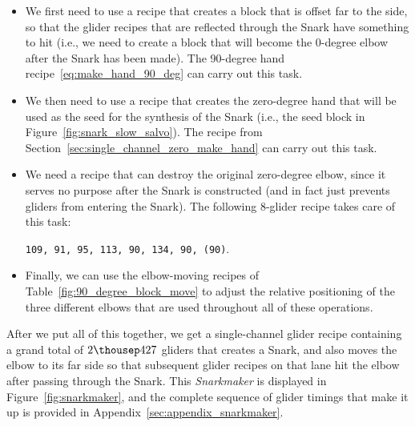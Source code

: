 \begin{itemize}
	\item We first need to use a recipe that creates a block that is offset far to the side, so that the glider recipes that are reflected through the Snark have something to hit (i.e., we need to create a block that will become the 0-degree elbow after the Snark has been made). The 90-degree hand recipe~\eqref{eq:make_hand_90_deg} can carry out this task.\smallskip
	
	\item We then need to use a recipe that creates the zero-degree hand that will be used as the seed for the synthesis of the Snark (i.e., the seed block in Figure~\ref{fig:snark_slow_salvo}). The recipe from Section~\ref{sec:single_channel_zero_make_hand} can carry out this task.\smallskip
	
	\item We need a recipe that can destroy the original zero-degree elbow, since it serves no purpose after the Snark is constructed (and in fact just prevents gliders from entering the Snark). The following 8-glider recipe takes care of this task:
	
	\begin{center}
		\texttt{\small 109, 91, 95, 113, 90, 134, 90, {\color{gray}(90)}}.
	\end{center}
	
	\item Finally, we can use the elbow-moving recipes of Table~\ref{fig:90_degree_block_move} to adjust the relative positioning of the three different elbows that are used throughout all of these operations.\smallskip
\end{itemize}

After we put all of this together, we get a single-channel glider recipe containing a grand total of $2{\thousep}427$ gliders that creates a Snark, and also moves the elbow to its far side so that subsequent glider recipes on that lane hit the elbow after passing through the Snark. This \emph{Snarkmaker} is displayed in Figure~\ref{fig:snarkmaker}, and the complete sequence of glider timings that make it up is provided in Appendix~\ref{sec:appendix_snarkmaker}.

